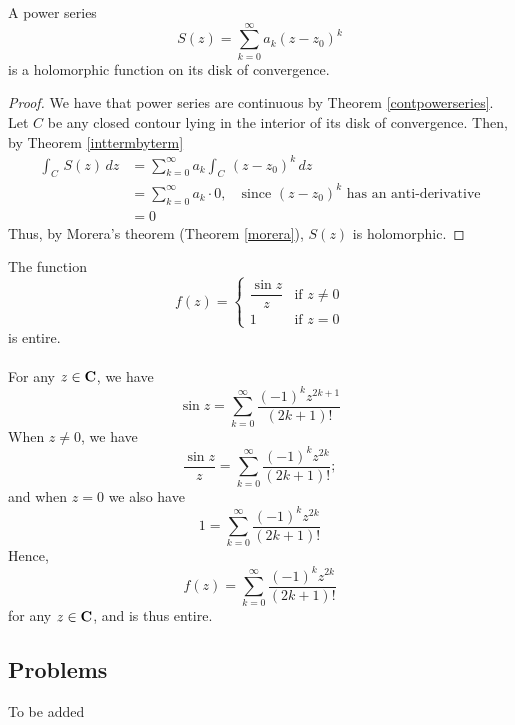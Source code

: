 \begin{corollary}
A power series
\[S(z) = \sum_{k=0}^\infty a_k(z - z_0)^k\]
is a holomorphic function on its disk of convergence. 
\end{corollary}
\begin{proof}
We have that power series are continuous by Theorem \ref{contpowerseries}. Let $C$ be any closed contour lying in the interior of its disk of convergence. Then, by Theorem \ref{inttermbyterm}
\begin{align*}
\int_C\,S(z)\,dz &= \sum_{k=0}^\infty a_k\int_C\,(z - z_0)^k\,dz\\[1em]
 &= \sum_{k=0}^\infty a_k\cdot 0,\quad \text{since $(z - z_0)^k$ has an anti-derivative}\\[0.5em]
 &= 0
\end{align*}
Thus, by Morera's theorem (Theorem \ref{morera}), $S(z)$ is holomorphic.
\end{proof}

\vspace*{1em}

\begin{example}
The function
\[f(z) = \begin{cases}\dfrac{\sin z}{z} & \text{if } z \neq 0\\[1em] 1 & \text{if } z = 0 \end{cases}\] 
is entire.\\
\\
For any $z \in \mathbf C$, we have
\[\sin z = \sum_{k=0}^\infty\frac{(-1)^kz^{2k + 1}}{(2k + 1)!}\]
When $z \neq 0$, we have
\[\frac{\sin z}{z} = \sum_{k=0}^\infty\frac{(-1)^kz^{2k}}{(2k + 1)!};\]
and when $z = 0$ we also have
\[1 = \sum_{k=0}^\infty\frac{(-1)^kz^{2k}}{(2k + 1)!}\]
Hence,
\[f(z) = \sum_{k=0}^\infty\frac{(-1)^kz^{2k}}{(2k + 1)!}\]
for any $z \in \mathbf C$, and is thus entire.
\end{example}

\vspace*{2em}

\subsection{Problems}
\vspace{0.1in}
To be added
%
